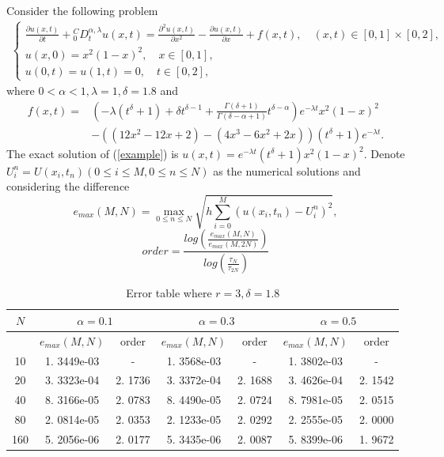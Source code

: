 \documentclass[10pt, reqno]{amsart}
\theoremstyle{remark}
\theoremstyle{definition}
\numberwithin{table}{section}
\begin{document}
Consider the following problem
\begin{equation}\label{example}
    \begin{aligned}
        \left\{\begin{array}{l}
\frac{\partial u(x,  t)}{\partial t}+{ }_0^C D_t^{\alpha,  \lambda} u(x,  t)=\frac{\partial^2 u(x,  t)}{\partial x^2}- \frac{\partial u(x,  t)}{\partial x}+f(x,  t),  \quad(x,  t) \in[0, 1] \times[0, 2],  \\
u(x,  0)=x^2(1-x)^2,  \quad x \in[0, 1],  \\
u(0,  t)=u(1,  t)=0,  \quad t \in[0, 2], 
\end{array}\right. 
    \end{aligned}
\end{equation}
where $0<\alpha<1,  \lambda=1,  \delta=1. 8$ and
$$
\begin{aligned}
f(x,  t)= & \left(-\lambda\left(t^\delta+1\right)+\delta t^{\delta-1}+\frac{\Gamma(\delta+1)}{\Gamma(\delta-\alpha+1)} t^{\delta-\alpha}\right) e^{-\lambda t} x^2(1-x)^2 \\
& -\left(\left(12 x^2-12 x+2\right)-\left(4 x^3-6 x^2+2 x\right)\right)\left(t^\delta+1\right) e^{-\lambda t} . 
\end{aligned}
$$
The exact solution of (\ref{example}) is $u(x,  t)=e^{-\lambda t}\left(t^\delta+1\right) x^2(1-x)^2$. Denote $U_i^n=U(x_i, t_n)(0\leq i\leq M, 0\leq n\leq N)$ as the numerical solutions and considering the difference
$$
e_{max}(M, N) = \max_{0\leq n\leq N}\sqrt{h\sum_{i=0}^M(u(x_i, t_n)-U_i^n)^2}, 
$$
$$order = \frac{log(\frac{e_{max}(M, N)}{e_{max}(M, 2N)})}{log(\frac{\tau_N}{\tau_{2N}})}$$
\begin{table}[h!]
\centering
\begin{tabular}{|c|c|c|c|c|c|c|}
\hline
$N$ & \multicolumn{2}{|c|}{$\alpha=0. 1$} & \multicolumn{2}{|c|}{$\alpha=0. 3$} & \multicolumn{2}{|c|}{$\alpha=0. 5$} \\ \hline
 & $e_{max}(M, N)$ & order & $e_{max}(M, N)$ & order & $e_{max}(M, N)$ & order \\ \hline
10  & 1. 3449e-03 & -   & 1. 3568e-03 & -   & 1. 3802e-03 & -  \\ \hline
20  & 3. 3323e-04 &2. 1736 & 3. 3372e-04 & 2. 1688
 &3. 4626e-04  & 2. 1542 \\ \hline
40 & 8. 3166e-05 & 2. 0783 & 8. 4490e-05 & 2. 0724
 & 8. 7981e-05 & 2. 0515 \\ \hline
80 & 2. 0814e-05 & 2. 0353 & 2. 1233e-05 &2. 0292
  & 2. 2555e-05 & 2. 0000 \\ \hline
  160 & 5. 2056e-06 & 2. 0177 & 5. 3435e-06 &2. 0087
  & 5. 8399e-06 & 1. 9672 \\ \hline
\end{tabular}
\caption{Error table where $r=3, \delta=1. 8$}
\label{table:errors}
\end{table}
\end{document}
